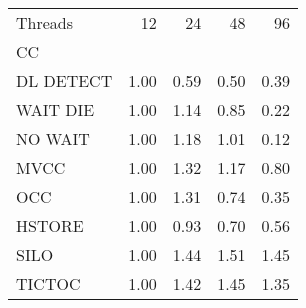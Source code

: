 \begin{tabular}{lrrrr}
\toprule
Threads &   12 &   24 &   48 &   96 \\
CC        &      &      &      &      \\
\midrule
DL DETECT & 1.00 & 0.59 & 0.50 & 0.39 \\
WAIT DIE  & 1.00 & 1.14 & 0.85 & 0.22 \\
NO WAIT   & 1.00 & 1.18 & 1.01 & 0.12 \\
MVCC      & 1.00 & 1.32 & 1.17 & 0.80 \\
OCC       & 1.00 & 1.31 & 0.74 & 0.35 \\
HSTORE    & 1.00 & 0.93 & 0.70 & 0.56 \\
SILO      & 1.00 & 1.44 & 1.51 & 1.45 \\
TICTOC    & 1.00 & 1.42 & 1.45 & 1.35 \\
\bottomrule
\end{tabular}
